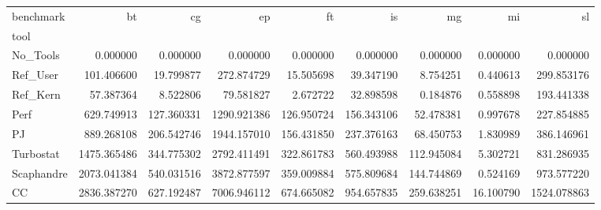 \begin{tabular}{lrrrrrrrr}
\toprule
benchmark & bt & cg & ep & ft & is & mg & mi & sl \\
tool &  &  &  &  &  &  &  &  \\
\midrule
No_Tools & 0.000000 & 0.000000 & 0.000000 & 0.000000 & 0.000000 & 0.000000 & 0.000000 & 0.000000 \\
Ref_User & 101.406600 & 19.799877 & 272.874729 & 15.505698 & 39.347190 & 8.754251 & 0.440613 & 299.853176 \\
Ref_Kern & 57.387364 & 8.522806 & 79.581827 & 2.672722 & 32.898598 & 0.184876 & 0.558898 & 193.441338 \\
Perf & 629.749913 & 127.360331 & 1290.921386 & 126.950724 & 156.343106 & 52.478381 & 0.997678 & 227.854885 \\
PJ & 889.268108 & 206.542746 & 1944.157010 & 156.431850 & 237.376163 & 68.450753 & 1.830989 & 386.146961 \\
Turbostat & 1475.365486 & 344.775302 & 2792.411491 & 322.861783 & 560.493988 & 112.945084 & 5.302721 & 831.286935 \\
Scaphandre & 2073.041384 & 540.031516 & 3872.877597 & 359.009884 & 575.809684 & 144.744869 & 0.524169 & 973.577220 \\
CC & 2836.387270 & 627.192487 & 7006.946112 & 674.665082 & 954.657835 & 259.638251 & 16.100790 & 1524.078863 \\
\bottomrule
\end{tabular}
